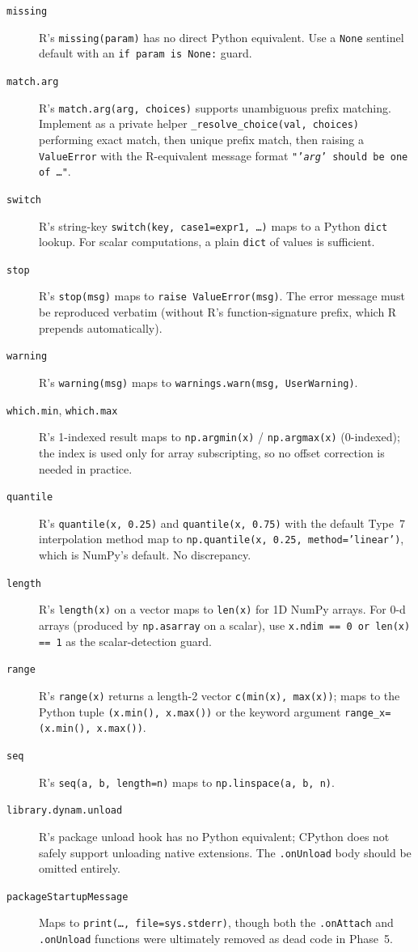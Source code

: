 \documentclass[12pt,a4paper]{article}
\begin{document}
\begin{description}
\item[\texttt{missing}] R's \texttt{missing(param)} has no direct Python equivalent. Use a \texttt{None} sentinel default with an \texttt{if param is None:} guard.
\item[\texttt{match.arg}] R's \texttt{match.arg(arg, choices)} supports unambiguous prefix matching. Implement as a private helper \texttt{\_resolve\_choice(val, choices)} performing exact match, then unique prefix match, then raising a \texttt{ValueError} with the R-equivalent message format \texttt{"'\textit{arg}' should be one of \ldots"}.
\item[\texttt{switch}] R's string-key \texttt{switch(key, case1=expr1, \ldots)} maps to a Python \texttt{dict} lookup. For scalar computations, a plain \texttt{dict} of values is sufficient.
\item[\texttt{stop}] R's \texttt{stop(msg)} maps to \texttt{raise ValueError(msg)}. The error message must be reproduced verbatim (without R's function-signature prefix, which R prepends automatically).
\item[\texttt{warning}] R's \texttt{warning(msg)} maps to \texttt{warnings.warn(msg, UserWarning)}.
\item[\texttt{which.min}, \texttt{which.max}] R's 1-indexed result maps to \texttt{np.argmin(x)} / \texttt{np.argmax(x)} (0-indexed); the index is used only for array subscripting, so no offset correction is needed in practice.
\item[\texttt{quantile}] R's \texttt{quantile(x, 0.25)} and \texttt{quantile(x, 0.75)} with the default Type~7 interpolation method map to \texttt{np.quantile(x, 0.25, method='linear')}, which is NumPy's default. No discrepancy.
\item[\texttt{length}] R's \texttt{length(x)} on a vector maps to \texttt{len(x)} for 1D NumPy arrays. For 0-d arrays (produced by \texttt{np.asarray} on a scalar), use \texttt{x.ndim == 0 or len(x) == 1} as the scalar-detection guard.
\item[\texttt{range}] R's \texttt{range(x)} returns a length-2 vector \texttt{c(min(x), max(x))}; maps to the Python tuple \texttt{(x.min(), x.max())} or the keyword argument \texttt{range\_x=(x.min(), x.max())}.
\item[\texttt{seq}] R's \texttt{seq(a, b, length=n)} maps to \texttt{np.linspace(a, b, n)}.
\item[\texttt{library.dynam.unload}] R's package unload hook has no Python equivalent; CPython does not safely support unloading native extensions. The \texttt{.onUnload} body should be omitted entirely.
\item[\texttt{packageStartupMessage}] Maps to \texttt{print(\ldots, file=sys.stderr)}, though both the \texttt{.onAttach} and \texttt{.onUnload} functions were ultimately removed as dead code in Phase~5.
\end{description}
\end{document}
